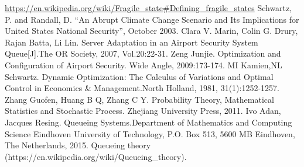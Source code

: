 \documentclass{mcmthesis}
\begin{document}
	\begin{thebibliography}{99}
		\url{https://en.wikipedia.org/wiki/Fragile_state#Defining_fragile_states}
		Schwartz, P. and Randall, D. “An Abrupt Climate Change Scenario and Its Implications for United States National Security”, October 2003.
		Clara V. Marin, Colin G. Drury, Rajan Batta, Li Lin. Server Adaptation in an Airport Security System Queue[J].The OR Society, 2007, Vol.20:22-31.
		Zeng Junjie. Optimization and Configuration of Airport Security. Wide Angle, 2009:173-174.
		MI Kamien,NL Schwartz. Dynamic Optimization: The Calculus of Variations and Optimal Control in Economics \& Management.North Holland, 1981, 31(1):1252-1257.
		Zhang Guofen, Huang B Q, Zhang C Y. Probability Theory, Mathematical Statistics and Stochastic Process. Zhejiang University Press, 2011.
		Ivo Adan, Jacques Resing. Queueing Systems.Department of Mathematics and Computing Science Eindhoven University of Technology, P.O. Box 513, 5600 MB Eindhoven, The Netherlands, 2015.
		Queueing theory (https://en.wikipedia.org/wiki/Queueing\_theory).
	\end{thebibliography}
	
\end{document}
